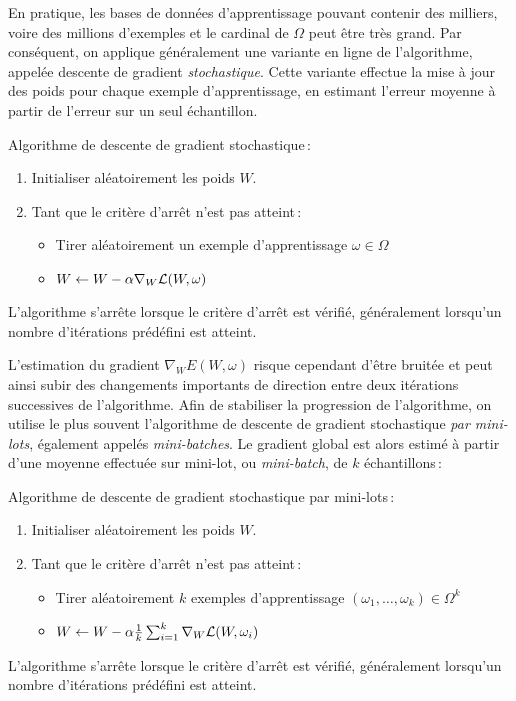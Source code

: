  En pratique, les bases de données d'apprentissage pouvant contenir des milliers, voire des millions d'exemples et le cardinal de $\Omega$ peut être très grand. Par conséquent, on applique généralement une variante en ligne de l'algorithme, appelée descente de gradient \emph{stochastique}. Cette variante effectue la mise à jour des poids pour chaque exemple d'apprentissage, en estimant l'erreur moyenne à partir de l'erreur sur un seul échantillon.
\begin{definition}
  Algorithme de descente de gradient stochastique\,:
  \begin{enumerate}
    \item Initialiser aléatoirement les poids $W$.
    \item Tant que le critère d'arrêt n'est pas atteint\,:
      \begin{itemize}
          \item Tirer aléatoirement un exemple d'apprentissage $\omega \in \Omega$
          \item $W \leftarrow W - \alpha \nabla_W \mathcal{L}(W, \omega)$
      \end{itemize}
  \end{enumerate}
L'algorithme s'arrête lorsque le critère d'arrêt est vérifié, généralement lorsqu'un nombre d'itérations prédéfini est atteint.
\end{definition}

L'estimation du gradient $\nabla_W E(W, \omega)$ risque cependant d'être bruitée et peut ainsi subir des changements importants de direction entre deux itérations successives de l'algorithme. Afin de stabiliser la progression de l'algorithme, on utilise le plus souvent l'algorithme de descente de gradient stochastique \emph{par mini-lots}, également appelés \emph{mini-batches}. Le gradient global est alors estimé à partir d'une moyenne effectuée sur mini-lot, ou \emph{mini-batch}, de $k$ échantillons\,:
\begin{definition}
  Algorithme de descente de gradient stochastique par mini-lots\,:
  \begin{enumerate}
    \item Initialiser aléatoirement les poids $W$.
    \item Tant que le critère d'arrêt n'est pas atteint\,:
      \begin{itemize}
          \item Tirer aléatoirement $k$ exemples d'apprentissage $(\omega_1,\dots,\omega_k) \in \Omega^k$
          \item $W \leftarrow W - \alpha \frac{1}{k} \sum_{i=1}^k \nabla_W \mathcal{L}(W, \omega_i)$
      \end{itemize}
  \end{enumerate}
L'algorithme s'arrête lorsque le critère d'arrêt est vérifié, généralement lorsqu'un nombre d'itérations prédéfini est atteint.
\end{definition}

